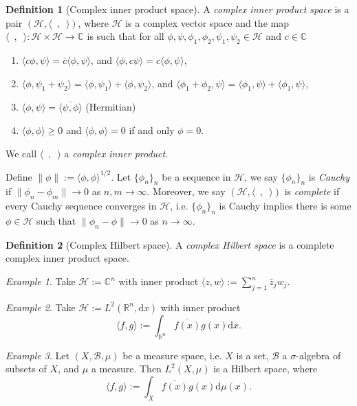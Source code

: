 \documentclass[11pt]{amsart}
\numberwithin{equation}{section}
\theoremstyle{plain}
\theoremstyle{definition}
\newtheorem{defn}{Definition}[subsection]
\theoremstyle{remark}
\newtheorem{ex}{Example}[subsection]
\newcommand{\R}{\mathbb{R}}
\newcommand{\dd}{{\mathrm{d}}}
\newcommand{\calB}{\mathcal{B}}
\newcommand{\calH}{\mathcal{H}}
\begin{document}
\begin{defn}[Complex inner product space]
A \emph{complex inner product space} is a pair $(\calH,\langle\enspace,\enspace\rangle)$, where $\calH$ is a complex vector space and the map $\langle\enspace,\enspace\rangle\colon \calH\times\calH\to \mathbb{C}$ is such that for all $\phi,\psi,\phi_1,\phi_2,\psi_1,\psi_2\in\calH$ and $c\in\mathbb{C}$
\begin{enumerate}
\item{$\langle c\phi,\psi\rangle=\bar c\langle \phi,\psi\rangle$, and $\langle\phi,c\psi\rangle=c\langle \phi,\psi\rangle$,
}
\item{$\langle \phi,\psi_1+\psi_2\rangle=\langle\phi,\psi_1\rangle+\langle\phi,\psi_2\rangle$, and $\langle \phi_1+\phi_2,\psi\rangle=\langle\phi_1,\psi\rangle+\langle\phi_1,\psi\rangle$,
}
\item{$\langle\phi,\psi\rangle=\overline{\langle\psi,\phi\rangle}$ (Hermitian)
}
\item{$\langle\phi,\phi\rangle\geq0$ and $\langle\phi,\phi\rangle=0$ if and only $\phi=0$.
}
\end{enumerate}
We call $\langle\enspace,\enspace\rangle$ a \emph{complex inner product}.
\end{defn}
Define $\|\phi\|:=\langle\phi,\phi\rangle^{1/2}$. Let $\{\phi_n\}_n$ be a sequence in $\calH$, we say $\{\phi_n\}_n$ is \emph{Cauchy} if $\|\phi_n-\phi_m\|\to 0$ as $n,m\to \infty$. Moreover, we say $(\calH,\langle\enspace,\enspace\rangle)$ is \emph{complete} if every Cauchy sequence converges in $\calH$, i.e. $\{\phi_n\}_n$ is Cauchy implies there is some $\phi\in \calH$ such that $\|\phi_n-\phi\|\to 0$ as $n\to\infty$.

\begin{defn}[Complex Hilbert space]
A \emph{complex Hilbert space} is a complete complex inner product space.
\end{defn}


\begin{ex}
Take $\calH:=\mathbb{C}^n$ with inner product $\langle z,w\rangle:=\sum_{j=1}^n\bar z_jw_j$.
\end{ex}

\begin{ex}
Take $\calH:=L^2(\R^n,\dd x)$ with inner product 
\[
\langle f,g\rangle:=\int_{\R^n}\overline{f(x)}g(x)\dd x.
\]
\end{ex}

\begin{ex}
Let $(X,\calB,\mu)$ be a measure space, i.e. $X$ is a set, $\calB$ a $\sigma$-algebra of subsets of $X$, and $\mu$ a measure. Then $L^2(X,\mu)$ is a Hilbert space, where 
\[
\langle f,g\rangle:=\int_X\overline{f(x)}g(x)\dd\mu(x).
\]
\end{ex}
\end{document}
